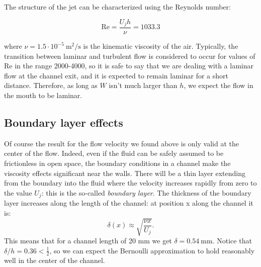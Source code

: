 \documentclass[a4paper]{article}
\begin{document}
The structure of the jet can be characterized using the Reynolds number:

$$ \mathrm{Re} = \frac{U_j h}{\nu} = 1033.3 $$

where $\nu = 1.5 \cdot 10^{-5}~ \si{\meter\squared\per\second}$ is the kinematic viscosity of the air. Typically, the transition between laminar and turbulent flow is considered to occur for values of Re in the range 2000-4000, so it is safe to say that we are dealing with a laminar flow at the channel exit, and it is expected to remain laminar for a short distance. Therefore, as long as $W$ isn't much larger than $h$, we expect the flow in the mouth to be laminar. 

\subsection{Boundary layer effects}
Of course the result for the flow velocity we found above is only valid at the center of the flow. Indeed, even if the fluid can be safely assumed to be frictionless in open space, the boundary conditions in a channel make the viscosity effects significant near the walls. There will be a thin layer extending from the boundary into the fluid where the velocity increases rapidly from zero to the value $U_j$: this is the so-called \emph{boundary layer}. The thickness of the boundary layer increases along the length of the channel: at position x along the channel it is:
$$ \delta(x) \approx \sqrt{\frac{\nu x}{U_j}}. $$
This means that for a channel length of 20 mm we get $\delta = \SI{0.54}{\milli\meter}$. Notice that $\delta/h = 0.36 < \frac{1}{2}$, so we can expect the Bernoulli approximation to hold reasonably well in the center of the channel.
\end{document}
